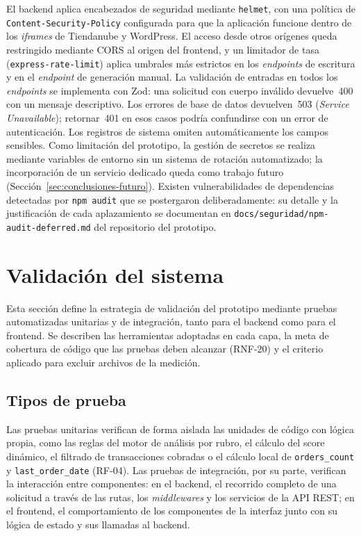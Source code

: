 El backend aplica encabezados de seguridad mediante \texttt{helmet}, con una política de \texttt{Content-Security-Policy} configurada para que la aplicación funcione dentro de los \emph{iframes} de Tiendanube y WordPress. El acceso desde otros orígenes queda restringido mediante CORS al origen del frontend, y un limitador de tasa (\texttt{express-rate-limit}) aplica umbrales más estrictos en los \emph{endpoints} de escritura y en el \emph{endpoint} de generación manual. La validación de entradas en todos los \emph{endpoints} se implementa con Zod: una solicitud con cuerpo inválido devuelve~400 con un mensaje descriptivo. Los errores de base de datos devuelven~503 (\emph{Service Unavailable}); retornar~401 en esos casos podría confundirse con un error de autenticación. Los registros de sistema omiten automáticamente los campos sensibles. Como limitación del prototipo, la gestión de secretos se realiza mediante variables de entorno sin un sistema de rotación automatizado; la incorporación de un servicio dedicado queda como trabajo futuro (Sección~\ref{sec:conclusiones-futuro}). Existen vulnerabilidades de dependencias detectadas por \texttt{npm audit} que se postergaron deliberadamente: su detalle y la justificación de cada aplazamiento se documentan en \texttt{docs/seguridad/npm-audit-deferred.md} del repositorio del prototipo.





\section{Validación del sistema}
\label{sec:validacion}

Esta sección define la estrategia de validación del prototipo mediante pruebas automatizadas unitarias y de integración, tanto para el backend como para el frontend. Se describen las herramientas adoptadas en cada capa, la meta de cobertura de código que las pruebas deben alcanzar (RNF-20) y el criterio aplicado para excluir archivos de la medición.

\subsection{Tipos de prueba}
\label{sec:tipos-prueba}

Las pruebas unitarias verifican de forma aislada las unidades de código con lógica propia, como las reglas del motor de análisis por rubro, el cálculo del score dinámico, el filtrado de transacciones cobradas o el cálculo local de \texttt{orders\_count} y \texttt{last\_order\_date} (RF-04). Las pruebas de integración, por su parte, verifican la interacción entre componentes: en el backend, el recorrido completo de una solicitud a través de las rutas, los \emph{middlewares} y los servicios de la API REST; en el frontend, el comportamiento de los componentes de la interfaz junto con su lógica de estado y sus llamadas al backend.

